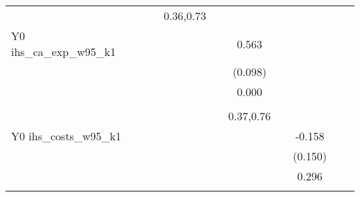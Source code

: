 \begin{table}[!h]
\begin{adjustbox}{width=\columnwidth,center}
\begin{tabular}{l*{8}{c}}
                    &                     &                     &   0.36,0.73         &                     &                     &                     &                     &                     &                     &                     \\
Y0 ihs\_ca\_exp\_w95\_k1&                     &                     &                     &                     &       0.563\sym{***}&                     &                     &                     &                     &                     \\
                    &                     &                     &                     &                     &     (0.098)         &                     &                     &                     &                     &                     \\
                    &                     &                     &                     &                     &       0.000         &                     &                     &                     &                     &                     \\
                    &                     &                     &                     &                     &                     &                     &                     &                     &                     &                     \\
                    &                     &                     &                     &                     &   0.37,0.76         &                     &                     &                     &                     &                     \\
Y0 ihs\_costs\_w95\_k1 &                     &                     &                     &                     &                     &                     &      -0.158         &                     &                     &                     \\
                    &                     &                     &                     &                     &                     &                     &     (0.150)         &                     &                     &                     \\
                    &                     &                     &                     &                     &                     &                     &       0.296         &                     &                     &                     \\
                    &                     &                     &                     &                     &                     &                     &                     &                     &                     &                     \\

\end{tabular}
\end{adjustbox}
\end{table}
